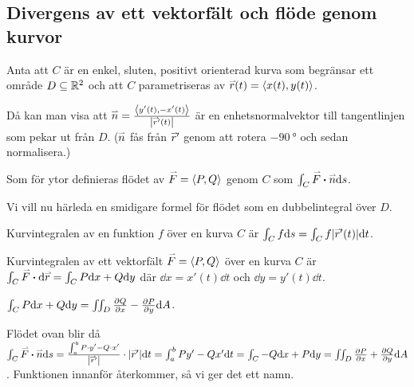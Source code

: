 \documentclass[a4paper]{article}
\begin{document}
\providecommand\fname{}
\renewcommand\fname{19-10-17}

\subsection{Divergens av ett vektorfält och flöde genom kurvor}
\begin{defn}
    Anta att \(
        C
    \) är en enkel, sluten, positivt orienterad kurva som begränsar ett område \(
        D \subseteq \mathbb{R}^2
    \) och att \(
        C
    \) parametriseras av \(
        \accentset{\rightharpoonup}{r}(t) = \left\langle x(t), y(t)\right\rangle
    \).

    Då kan man visa att \(
        \accentset{\rightharpoonup}{n} = \frac{\left\langle y'(t), -x'(t)\right\rangle}{\abs{\accentset{\rightharpoonup}{r}'(t)}}
    \) är en enhetsnormalvektor till tangentlinjen som pekar ut från \(
        D
    \). (\(
        \accentset{\rightharpoonup}{n}
    \) fås från \(
        \accentset{\rightharpoonup}{r}'
    \) genom att rotera \(
        \SI{-90}{\degree}
    \) och sedan normalisera.)

    Som för ytor definieras flödet av \(
        \accentset{\rightharpoonup}{F} = \left\langle P, Q \right\rangle 
    \) genom \(
        C
    \) som \(
        \int_C \vef \sprod \ven \dd s
    \). 
\end{defn}

Vi vill nu härleda en smidigare formel för flödet som en dubbelintegral över \(
    D
\).

\begin{påm}
    Kurvintegralen av en funktion \(
        f
    \) över en kurva \(
        C
    \) är \(
        \int_C f \dd s = \int_C f \abs{\accentset{\rightharpoonup}{r}'(t)}\dd t
    \).
\end{påm}

\begin{påm}
    Kurvintegralen av ett vektorfält \(
        \accentset{\rightharpoonup}{F}  = \left\langle P, Q \right\rangle
    \) över en kurva \(
        C
    \) är \(
        \int_C \vef \sprod \dd \ver = \int_C P \dd x + Q \dd y
    \) där \(
        \dd x = x'(t) \dd t 
    \) och \(
        \dd y = y'(t) \dd t
    \).
\end{påm}

\begin{påm}
    \(
        \int_C P \dd x + Q \dd y = \iint_D \pdv{Q}{x}-\pdv{P}{y} \dd A
    \).
\end{påm}

Flödet ovan blir då \(
    \int_C \vef \sprod \ven \dd s = \frac{\int_a^b P \cdot y' - Q \cdot x'}{\abs{\ver'}} \cdot \abs{\ver'}\dd t
        = \int_a^b P y' - Qx' \dd t
        = \int_C -Q \dd x + P \dd y
        = \iint_D \pdv{P}{x}+\pdv{Q}{y}\dd A
\). Funktionen innanför återkommer, så vi ger det ett namn.
\end{document}
